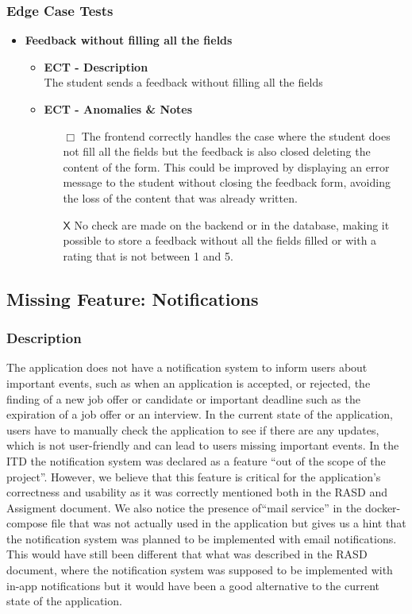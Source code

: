 \subsubsection{Edge Case Tests}
\begin{itemize} [label= {\color{titleColor}\(\diamond\)}]
    \item \textbf{\color{titleColor} Feedback without filling all the fields}
    \begin{itemize}
        \item \textbf{\color{titleColor} ECT - Description}\\ The student sends a feedback without filling all the fields
        \item \textbf{\color{titleColor} ECT - Anomalies \& Notes}
        \begin{itemize}
            \item [{\color{titleColor}\(\Box \)}] The frontend correctly handles the case where the student does not fill all the fields but the feedback is also closed deleting the content of the form. This could be improved by displaying an error message to the student without closing the feedback form, avoiding the loss of the content that was already written.
            \item [{\color{titleColor}\(\mathsf{X}\)}] No check are made on the backend or in the database, making it possible to store a feedback without all the fields filled or with a rating that is not between 1 and 5.
        \end{itemize}
    \end{itemize}
\end{itemize}

\subsection{Missing Feature:  Notifications}
\subsubsection{Description}
The application does not have a notification system to inform users about important events, such as when an application is accepted, or rejected, the finding of a new job offer or candidate or important deadline such as the expiration of a job offer or an interview. In the current state of the application, users have to manually check the application to see if there are any updates, which is not user-friendly and can lead to users missing important events. 
In the ITD the notification system was declared as a feature “out of the scope of the project”. However, we believe that this feature is critical for the application's correctness and usability as it was correctly mentioned both in the RASD and Assigment document. We also notice the presence of“mail service” in the docker-compose file that was not actually used in the application but gives us a hint that the notification system was planned to be implemented with email notifications. This would have still been different that what was described in the RASD document, where the notification system was supposed to be implemented with in-app notifications but it would have been a good alternative to the current state of the application.
